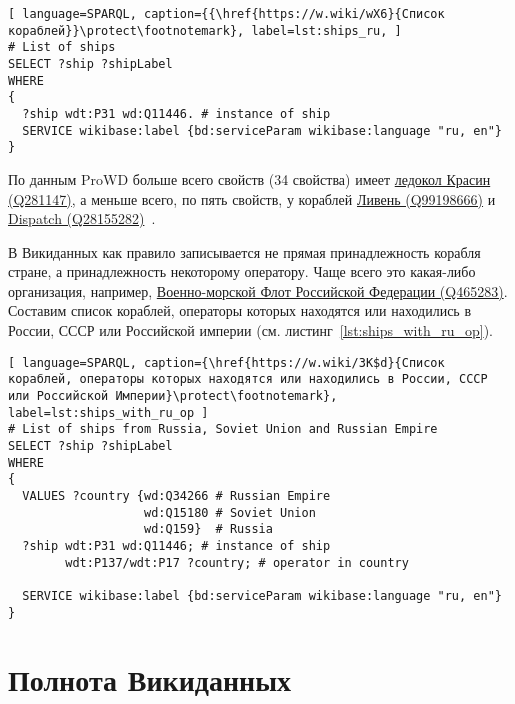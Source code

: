 \begin{lstlisting}[ language=SPARQL, caption={{\href{https://w.wiki/wX6}{Список кораблей}}\protect\footnotemark}, label=lst:ships_ru, ]
# List of ships
SELECT ?ship ?shipLabel
WHERE
{
  ?ship wdt:P31 wd:Q11446. # instance of ship
  SERVICE wikibase:label {bd:serviceParam wikibase:language "ru, en"}
}
\end{lstlisting}

По данным ProWD больше всего свойств (34 свойства) имеет \href{https://www.wikidata.org/wiki/Q281147}{ледокол Красин (Q281147)}, а меньше всего, по пять свойств, у кораблей \href{https://www.wikidata.org/wiki/Q99198666}{Ливень (Q99198666)} и \href{https://www.wikidata.org/wiki/Q28155282}{Dispatch (Q28155282)}~\cite{ProWD_ru_ships}.

В Викиданных как правило записывается не прямая принадлежность корабля стране, а принадлежность некоторому оператору. Чаще всего это какая-либо организация, например, \href{https://www.wikidata.org/wiki/Q465283}{Военно-морской Флот Российской Федерации (Q465283)}. Составим список кораблей, операторы которых находятся или находились в России, СССР или Российской империи (см. листинг~\ref{lst:ships_with_ru_op}).

\begin{lstlisting}[ language=SPARQL, caption={\href{https://w.wiki/3K$d}{Cписок кораблей, операторы которых находятся или находились в России, СССР или Российской Империи}\protect\footnotemark}, label=lst:ships_with_ru_op ]
# List of ships from Russia, Soviet Union and Russian Empire
SELECT ?ship ?shipLabel
WHERE
{
  VALUES ?country {wd:Q34266 # Russian Empire
                   wd:Q15180 # Soviet Union
                   wd:Q159}  # Russia
  ?ship wdt:P31 wd:Q11446; # instance of ship
        wdt:P137/wdt:P17 ?country; # operator in country

  SERVICE wikibase:label {bd:serviceParam wikibase:language "ru, en"}
}
\end{lstlisting}


\section{Полнота Викиданных}

